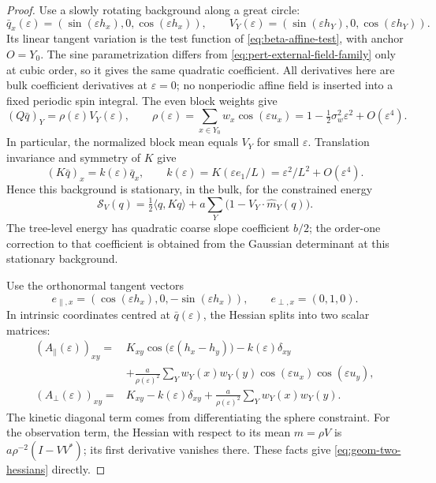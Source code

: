 \documentclass[11pt]{article}
\newcommand{\Id}{I}
\numberwithin{equation}{section}
\theoremstyle{definition}
\theoremstyle{plain}
\begin{document}
\begin{proof}
Use a slowly rotating
background along a great circle:
\begin{equation}
 \bar q_x(\varepsilon)
   =(\sin(\varepsilon h_x),0,\cos(\varepsilon h_x)),\qquad
 V_Y(\varepsilon)
   =(\sin(\varepsilon h_Y),0,\cos(\varepsilon h_Y)).
 \label{eq:geom-helical-background}
\end{equation}
Its linear tangent variation is the test function of
\eqref{eq:beta-affine-test}, with anchor $O=Y_0$.
The sine parametrization differs from
\eqref{eq:pert-external-field-family} only at cubic order, so it
gives the same quadratic coefficient.  All derivatives here are bulk coefficient
derivatives at $\varepsilon=0$; no nonperiodic affine field is
inserted into a fixed periodic spin integral.
The even block weights give
\begin{equation}
 (Q\bar q)_Y=\rho(\varepsilon)V_Y(\varepsilon),\qquad
 \rho(\varepsilon)
   =\sum_{x\in Y_0}w_x\cos(\varepsilon u_x)
   =1-\tfrac12\sigma_w^2\varepsilon^2+O(\varepsilon^4).
 \label{eq:geom-block-mean}
\end{equation}
In particular, the normalized block mean equals $V_Y$ for small
$\varepsilon$.  Translation invariance and symmetry of $K$ give
\begin{equation}
 (K\bar q)_x=k(\varepsilon)\bar q_x,\qquad
 k(\varepsilon)=K(\varepsilon e_1/L)
               =\varepsilon^2/L^2+O(\varepsilon^4).
\end{equation}
Hence this background is stationary, in the bulk, for the
constrained energy
\begin{equation}
 \mathcal S_V(q)
 =\tfrac12\langle q,Kq\rangle
       +a\sum_Y\bigl(1-V_Y\cdot\widehat m_Y(q)\bigr).
 \label{eq:geom-constrained-energy}
\end{equation}
The tree-level energy has quadratic coarse slope coefficient
$b/2$; the order-one correction to that coefficient is obtained
from the Gaussian determinant at this stationary background.

Use the orthonormal tangent vectors
\begin{equation}
 e_{\parallel,x}
   =(\cos(\varepsilon h_x),0,-\sin(\varepsilon h_x)),
 \qquad e_{\perp,x}=(0,1,0).
\end{equation}
In intrinsic coordinates centred at $\bar q(\varepsilon)$, the
Hessian splits into two scalar matrices:
\begin{align}
 (A_\parallel(\varepsilon))_{xy}
 ={}&K_{xy}\cos\bigl(\varepsilon(h_x-h_y)\bigr)
        -k(\varepsilon)\delta_{xy} \nonumber\\
 &+\frac{a}{\rho(\varepsilon)^2}
       \sum_Y w_Y(x)w_Y(y)
             \cos(\varepsilon u_x)\cos(\varepsilon u_y),\\
 (A_\perp(\varepsilon))_{xy}
 ={}&K_{xy}-k(\varepsilon)\delta_{xy}
       +\frac{a}{\rho(\varepsilon)^2}
             \sum_Yw_Y(x)w_Y(y).
 \label{eq:geom-two-hessians}
\end{align}
The kinetic diagonal term comes from differentiating the sphere
constraint.  For the observation term, the Hessian with respect
to its mean $m=\rho V$ is
$a\rho^{-2}(\Id-VV^*)$; its first derivative vanishes there.
These facts give \eqref{eq:geom-two-hessians} directly.


\end{proof}
\end{document}
